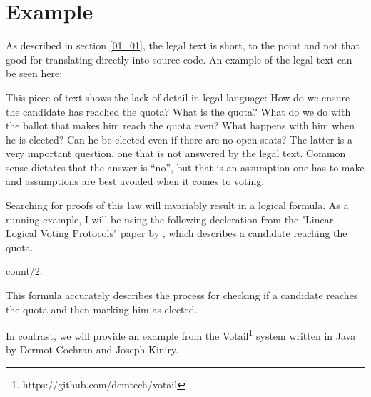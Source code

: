 \section{Example}
\label{02_01}

As described in section \ref{01_01}, the legal text is short, to the point and not that good for translating directly into source code. An example of the legal text can be seen here:


This piece of text shows the lack of detail in legal language: How do we ensure the candidate has reached the quota? What is the quota? What do we do with the ballot that makes him reach the quota even? What happens with him when he is elected? Can he be elected even if there are no open seats? The latter is a very important question, one that is not answered by the legal text. Common sense dictates that the answer is “no”, but that is an assumption one has to make and assumptions are best avoided when it comes to voting.


Searching for proofs of this law will invariably result in a logical formula. As a running example, I will be using the following decleration from the "Linear Logical Voting Protocols"\cite{Deyoung11} paper by \citeauthor{Deyoung11}, which describes a candidate reaching the quota.

\begin{textoform}
	count/2: \\
\end{textoform}

This formula accurately describes the process for checking if a candidate reaches the quota and then marking him as elected.

In contrast, we will provide an example from the Votail\footnote{https://github.com/demtech/votail} system written in Java by Dermot Cochran and Joseph Kiniry.

